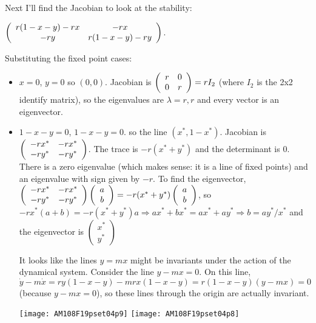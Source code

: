 \documentclass[12pt,letterpaper,answers]{exam}
\begin{document}
\begin{questions}
\begin{parts}
\begin{solution}
Next I'll find the Jacobian to look at the stability: 

$\left(\begin{array}{c c }r(1-x-y) - rx & -rx \\ -ry & r(1-x-y) - ry \end{array}\right)$.

Substituting the fixed point cases:
\begin{itemize}
\item $x = 0$, $y = 0$ so $(0,0)$.  Jacobian is $\left(\begin{array}{c c }r & 0 \\ 0 & r \end{array}\right) = r I_2$ (where $I_2$ is the 2x2 identify matrix), so the eigenvalues are $\lambda = r, r$ and every vector is an eigenvector.
\item $1 -x -y = 0$, $1-x-y = 0$. so the line $(x^*, 1-x^*)$.  Jacobian is $\left(\begin{array}{c c }- rx^* & -rx^* \\ -ry^* & - ry^* \end{array}\right)$.  The trace is $-r (x^*+y^*)$ and the determinant is $0$.  There is a zero eigenvalue (which makes sense: it is a line of fixed points) and an eigenvalue with sign given by $-r$. To find the eigenvector, $\left(\begin{array}{c c }- rx^* & -rx^* \\ -ry^* & - ry^* \end{array}\right)\left(\begin{array}{c} a \\ b\end{array}\right) = -r(x^*+y^*)\left(\begin{array}{c} a \\ b\end{array}\right)$, so $-rx^*(a+b) = -r(x^*+y^*) a \Rightarrow ax^* + bx^* = ax^* + ay^* \Rightarrow b = ay^*/x^*$ and the eigenvector is $\left(\begin{array}{c} x^* \\ y^*\end{array}\right)$  

It looks like the lines $y = mx$ might be invariants under the action of the dynamical system.  Consider the line $y - m x = 0$.  On this line, $\dot{y} - m\dot{x} = r y(1-x-y) - m r x(1-x-y) = r(1-x-y)(y-mx) = 0$ (because $y-mx = 0$), so these lines through the origin are actually invariant.

\texttt{[image: AM108F19pset04p9]}
\texttt{[image: AM108F19pset04p8]}


\end{itemize}
\end{solution}
\end{parts}
\end{questions}
\end{document}
